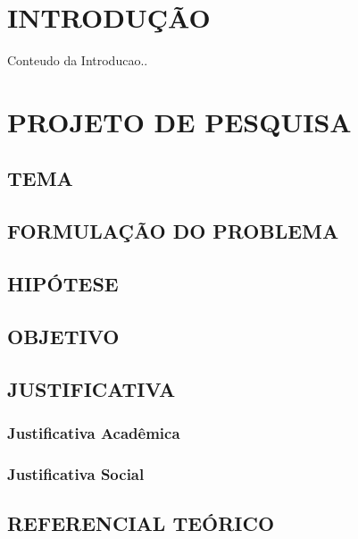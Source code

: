\documentclass[
	12pt,				%
	openright,			%
	oneside,			%
	a4paper,			%
	chapter=TITLE,		%
	english,			%
	french,				%
	spanish,			%
	brazil,				%
	article,			%
	]{uea-abntex2}
\begin{document}
\chapter*{\vspace*{3.4cm}INTRODUÇÃO}

Conteudo da Introducao..
\newpage
\chapter*{\vspace*{3.4cm}PROJETO DE PESQUISA}

\vspace{24pt}
\section{TEMA}

\section{FORMULAÇÃO DO PROBLEMA}

\section{HIPÓTESE}

\section{OBJETIVO}

\section{JUSTIFICATIVA}

\subsection{Justificativa Acadêmica}

\subsection{Justificativa Social}

\section{REFERENCIAL TEÓRICO}
\end{document}
